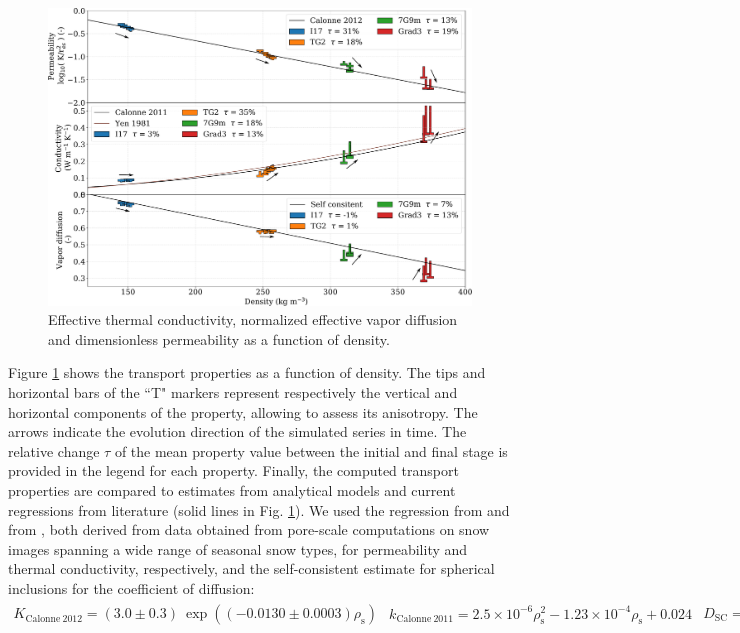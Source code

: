 \documentclass[draft,ms]{agujournal2019}
\begin{document}
\begin{figure}
    \centering
    \includegraphics[width=\linewidth]{Figures/tplot_all_arrows.pdf}
    \caption{Effective thermal conductivity, normalized effective vapor diffusion and dimensionless permeability as a function of density.}
    \label{fig:Tplot}
\end{figure}

Figure \ref{fig:Tplot} shows the transport properties as a function of density. The tips and horizontal bars of the ``T" markers represent respectively the vertical and horizontal components of the property, allowing to assess its anisotropy. The arrows indicate the evolution direction of the simulated series in time. The relative change $\tau$ of the mean property value between the initial and final stage is provided in the legend for each property. Finally, the computed transport properties are compared to estimates from analytical models and current regressions from literature (solid lines in Fig. \ref{fig:Tplot}). %
We used the regression from  and from , both derived from data obtained from pore-scale computations on snow images spanning a wide range of seasonal snow types, for permeability and thermal conductivity, respectively, and the self-consistent estimate for spherical inclusions \cite{auriault2009homogenization} for the coefficient of diffusion:
\begin{subequations}
\begin{align}
K_{\mathrm{Calonne\ 2012}}=(3.0 \pm 0.3)\ \exp \left(\left(-0.0130 \pm 0.0003\right) \rho_{\mathrm{s}}\right)
\end{align}
\begin{align}
k_{\mathrm{Calonne\ 2011}}=2.5 \times 10^{-6} \rho_{\mathrm{s}}^{2}-1.23 \times 10^{-4} \rho_{\mathrm{s}}+0.024\end{align}
\begin{align}
D_{\mathrm{SC}} = 1 - \frac{3\rho_s}{2\rho_i}
\end{align}
\end{subequations}
\end{document}
